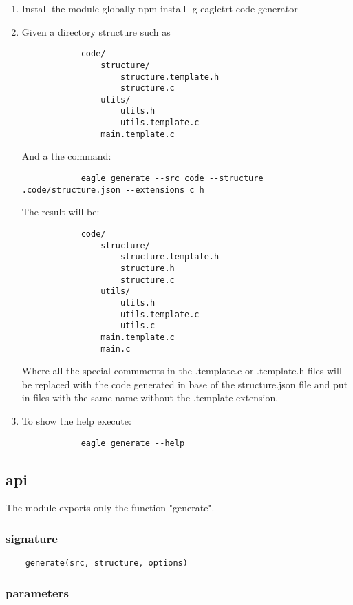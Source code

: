 \begin{enumerate}
    \item Install the module globally npm install -g eagletrt-code-generator
    \item Given a directory structure such as
        \begin{verbatim}
            code/
                structure/
                    structure.template.h
                    structure.c
                utils/
                    utils.h
                    utils.template.c
                main.template.c
        \end{verbatim}
        And a the command:
        \begin{verbatim}
            eagle generate --src code --structure .code/structure.json --extensions c h
        \end{verbatim}
        The result will be:
        \begin{verbatim}
            code/
                structure/
                    structure.template.h
                    structure.h
                    structure.c
                utils/
                    utils.h
                    utils.template.c
                    utils.c
                main.template.c
                main.c
        \end{verbatim}
        Where all the special commments in the .template.c or .template.h files will be replaced with the code generated in base of the structure.json file and put in files with the same name without the .template extension.
    \item To show the help execute:
        \begin{verbatim}
            eagle generate --help
        \end{verbatim}
\end{enumerate}

\subsection{api}

The module exports only the function "generate".

\subsubsection{signature}
\begin{verbatim}
    generate(src, structure, options)
\end{verbatim}

\subsubsection{parameters}

